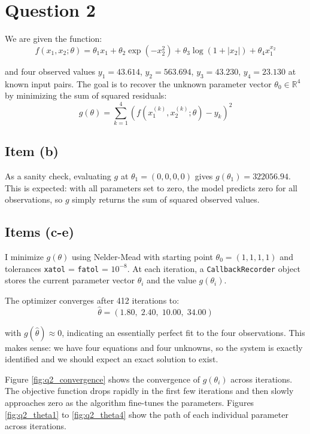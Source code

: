 \documentclass{article}
\begin{document}
\section{Question 2}
\label{sec:q2}

We are given the function:
$$
f(x_1, x_2; \theta) = \theta_1 x_1 + \theta_2 \exp(-x_2^2) + \theta_3 \log(1 + |x_2|) + \theta_4 x_1^{x_2}
$$

\noindent and four observed values $y_1 = 43.614$, $y_2 = 563.694$, $y_3 = 43.230$, $y_4 = 23.130$ at known input pairs. The goal is to recover the unknown parameter vector $\theta_0 \in \mathbb{R}^4$ by minimizing the sum of squared residuals:
$$
g(\theta) = \sum_{k=1}^{4} \left( f(x_1^{(k)}, x_2^{(k)}; \theta) - y_k \right)^2
$$

\subsection*{Item (b)}

As a sanity check, evaluating $g$ at $\theta_1 = (0,0,0,0)$ gives $g(\theta_1) = 322056.94$. This is expected: with all parameters set to zero, the model predicts zero for all observations, so $g$ simply returns the sum of squared observed values.

\subsection*{Items (c-e)}

I minimize $g(\theta)$ using Nelder-Mead with starting point $\theta_0 = (1,1,1,1)$ and tolerances \lstinline|xatol| = \lstinline|fatol| = $10^{-8}$. At each iteration, a \lstinline|CallbackRecorder| object stores the current parameter vector $\theta_i$ and the value $g(\theta_i)$.

The optimizer converges after 412 iterations to:
$$
\hat{\theta} = (1.80, \; 2.40, \; 10.00, \; 34.00)
$$

\noindent with $g(\hat{\theta}) \approx 0$, indicating an essentially perfect fit to the four observations. This makes sense: we have four equations and four unknowns, so the system is exactly identified and we should expect an exact solution to exist.

Figure \ref{fig:q2_convergence} shows the convergence of $g(\theta_i)$ across iterations. The objective function drops rapidly in the first few iterations and then slowly approaches zero as the algorithm fine-tunes the parameters. Figures \ref{fig:q2_theta1} to \ref{fig:q2_theta4} show the path of each individual parameter across iterations.
\end{document}

